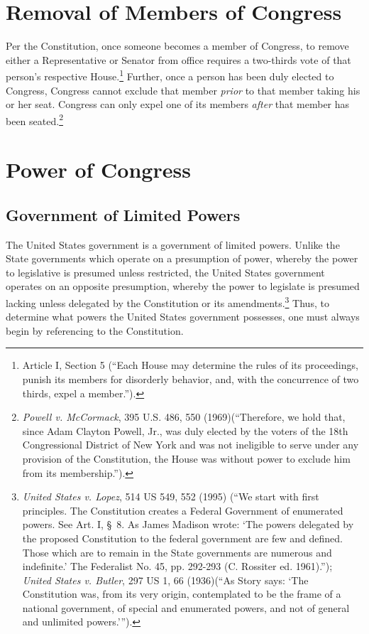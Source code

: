 \section{Removal of Members of Congress}
Per the Constitution, once someone becomes a member of Congress, to remove either a Representative or Senator from office requires a two-thirds vote of that person's respective House.\footnote{Article I, Section 5 (``Each House may determine the rules of its proceedings, punish its members for disorderly behavior, and, with the concurrence of two thirds, expel a member.'').}
Further, once a person has been duly elected to Congress, Congress cannot exclude that member \textit{prior} to that member taking his or her seat.  Congress can only expel one of its members \textit{after} that member has been seated.\footnote{\textit{Powell v. McCormack}, 395 U.S. 486, 550 (1969)(``Therefore, we hold that, since Adam Clayton Powell, Jr., was duly elected by the voters of the 18th Congressional District of New York and was not ineligible to serve under any provision of the Constitution, the House was without power to exclude him from its membership.'').}

\section{Power of Congress}

\subsection{Government of Limited Powers}
The United States government is a government of limited powers.  Unlike the State governments which operate on a presumption of power, whereby the power to legislative is presumed unless restricted, the United States government operates on an opposite presumption, whereby the power to legislate is presumed lacking unless delegated by the Constitution or its amendments.\footnote{\textit{United States v. Lopez}, 514 US 549, 552 (1995) (``We start with first principles. The Constitution creates a Federal Government of enumerated powers. See Art. I, \S\ 8. As James Madison wrote: `The powers delegated by the proposed Constitution to the federal government are few and defined. Those which are to remain in the State governments are numerous and indefinite.' The Federalist No. 45, pp. 292-293 (C. Rossiter ed. 1961).''); \textit{United States v. Butler}, 297 US 1, 66 (1936)(``As Story says: `The Constitution was, from its very origin, contemplated to be the frame of a national government, of special and enumerated powers, and not of general and unlimited powers.''').}
Thus, to determine what powers the United States government possesses, one must always begin by referencing to the Constitution.

